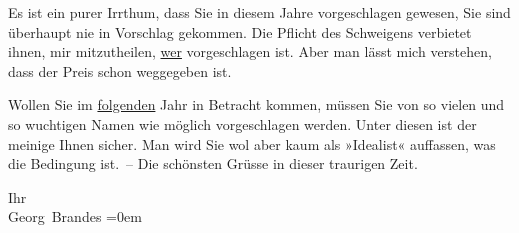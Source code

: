 \pstart
           Es ist ein purer Irrthum, dass Sie in diesem Jahre vorgeschlagen gewesen, Sie sind
               überhaupt nie in Vorschlag gekommen. Die Pflicht des Schweigens verbietet ihnen, mir
               mitzutheilen, \uline{wer} vorgeschlagen ist. Aber man lässt
               mich verstehen, dass der Preis schon weggegeben ist.\pend
           
\pstart
           Wollen Sie im \uline{folgenden} Jahr in Betracht kommen,
               müssen Sie  von so vielen und so wuchtigen
               Namen wie möglich vorgeschlagen werden. Unter diesen ist der meinige Ihnen sicher.
               Man wird Sie wol aber kaum als »Idealist« auffassen, was die Bedingung ist. – Die
               schönsten Grüsse in dieser traurigen Zeit.\pend
           
\pstart
           Ihr{\\[\baselineskip]}\spacefill\mbox{Georg Brandes}\pend
           \leftskip=0em{}\endnumbering{}  \newcommand{\dateiname}{L02198}\newcommand{\titel}{Georg Brandes an Arthur Schnitzler, 18. 10. 1914}\newcommand{\editorInnen}{Martin Anton Müller und Gerd-Hermann Susen}
